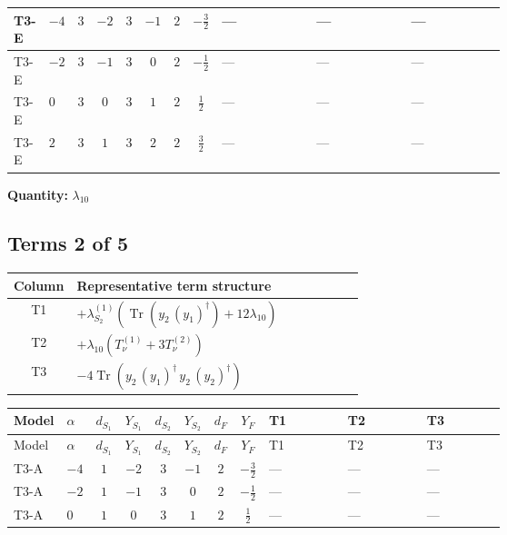 \documentclass[8pt]{article}
\begin{document}
\begin{landscape}
\begin{longtable}{@{}llcccccc >{\raggedright\arraybackslash}p{0.21\linewidth} >{\raggedright\arraybackslash}p{0.21\linewidth} >{\raggedright\arraybackslash}p{0.21\linewidth}@{}}
\midrule
T3-E & $-4$ & $3$ & $-2$ & $3$ & $-1$ & $2$ & $-\frac{3}{2}$ & --- & --- & --- \\
\midrule
T3-E & $-2$ & $3$ & $-1$ & $3$ & $0$ & $2$ & $-\frac{1}{2}$ & --- & --- & --- \\
\midrule
T3-E & $0$ & $3$ & $0$ & $3$ & $1$ & $2$ & $\frac{1}{2}$ & --- & --- & --- \\
\midrule
T3-E & $2$ & $3$ & $1$ & $3$ & $2$ & $2$ & $\frac{3}{2}$ & --- & --- & --- \\
\midrule
\bottomrule
\end{longtable}
\clearpage
\noindent\textbf{Quantity: }$\lambda_{10}$\par\smallskip
\subsection*{Terms 2 of 5}
\begin{center}
\begin{tabular}{@{}c >{\raggedright\arraybackslash}p{0.82\linewidth}@{}}
\toprule
Column & Representative term structure \\
\midrule
T1 & \(\displaystyle +{\lambda_{S_2}^{(1)}} (\operatorname{Tr}\!\left({y_2}\,\left({y_1}\right)^{\dagger}\right)+12 {\lambda_{10}})\) \\
\midrule
T2 & \(\displaystyle +{\lambda_{10}} (T_{\nu}^{(1)}+3 T_{\nu}^{(2)})\) \\
\midrule
T3 & \(\displaystyle -4 \operatorname{Tr}\!\left({y_2}\,\left({y_1}\right)^{\dagger}\,{y_2}\,\left({y_2}\right)^{\dagger}\right)\) \\
\midrule
\bottomrule
\end{tabular}
\end{center}
\smallskip
\tiny
\begin{longtable}{@{}llcccccc >{\raggedright\arraybackslash}p{0.21\linewidth} >{\raggedright\arraybackslash}p{0.21\linewidth} >{\raggedright\arraybackslash}p{0.21\linewidth}@{}}
\toprule
Model & $\alpha$ & $d_{S_1}$ & $Y_{S_1}$ & $d_{S_2}$ & $Y_{S_2}$ & $d_F$ & $Y_F$ & T1 & T2 & T3 \\
\midrule
\endfirsthead
\toprule
Model & $\alpha$ & $d_{S_1}$ & $Y_{S_1}$ & $d_{S_2}$ & $Y_{S_2}$ & $d_F$ & $Y_F$ & T1 & T2 & T3 \\
\midrule
\endhead
T3-A & $-4$ & $1$ & $-2$ & $3$ & $-1$ & $2$ & $-\frac{3}{2}$ & --- & --- & --- \\
\midrule
T3-A & $-2$ & $1$ & $-1$ & $3$ & $0$ & $2$ & $-\frac{1}{2}$ & --- & --- & --- \\
\midrule
T3-A & $0$ & $1$ & $0$ & $3$ & $1$ & $2$ & $\frac{1}{2}$ & --- & --- & --- \\

\end{longtable}
\end{landscape}
\end{document}
